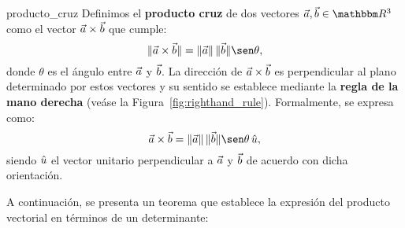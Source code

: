 \begin{definition}{}{producto_cruz}
    Definimos el \textbf{producto cruz} de dos vectores $\veca, \vecb \in \RR[3]$ como el vector $\vec{a} \times \vec{b}$ que cumple:
    $$\|\veca \times \vecb\| = \|\veca\|\,\|\vecb\| \sen \theta,$$
    donde $\theta$ es el ángulo entre $\vec{a}$ y $\vec{b}$. La dirección de $\vec{a} \times \vec{b}$ es perpendicular al plano determinado por estos vectores y su sentido se establece mediante la \textbf{regla de la mano derecha} (veáse la Figura~\ref{fig:righthand_rule}). Formalmente, se expresa como:
    $$\veca \times \vecb = \|\veca\|\,\|\vecb\| \sen \theta \,\vecu,$$
    siendo $\hat{u}$ el vector unitario perpendicular a $\vec{a}$ y $\vec{b}$ de acuerdo con dicha orientación.
\end{definition}

A continuación, se presenta un teorema que establece la expresión del producto vectorial en términos de un determinante:

